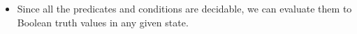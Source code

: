 \begin{itemize}
    
    \item Since all the predicates and conditions are decidable, we can evaluate them to Boolean truth values in any given state.
    \begin{code}
        \>[2]\AgdaSpace{}%
        \AgdaSymbol{:}\AgdaSpace{}%
        \AgdaSpace{}%
        \AgdaSpace{}%
        \AgdaSpace{}%
        \AgdaSpace{}%
        \<%
        \\
        \>[2]\AgdaSpace{}%
        \AgdaSpace{}%
        \AgdaSpace{}%
        \AgdaSymbol{=}\AgdaSpace{}%
        \AgdaSpace{}%
        \AgdaSpace{}%
        \AgdaSpace{}%
        \<%
        \\
        \\[\AgdaEmptyExtraSkip]%
        \>[2]\AgdaSpace{}%
        \AgdaSymbol{:}\AgdaSpace{}%
        \AgdaSpace{}%
        \AgdaSpace{}%
        \AgdaSpace{}%
        \AgdaSpace{}%
        \<%
        \\
        \>[2]\AgdaSpace{}%
        \AgdaSpace{}%
        \AgdaSpace{}%
        \AgdaSymbol{=}\AgdaSpace{}%
        \AgdaSpace{}%
        \<%
    \end{code}
\end{itemize}

